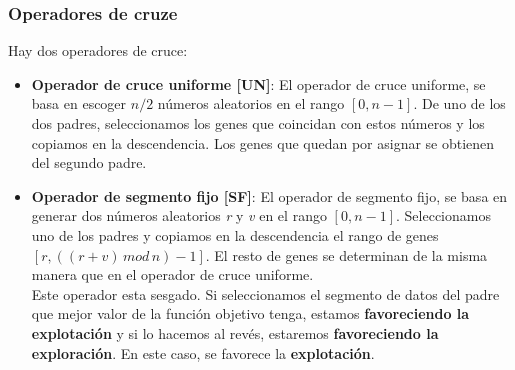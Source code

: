 \subsubsection{Operadores de cruze}
Hay dos operadores de cruce:
\begin{itemize}
   \item \textbf{Operador de cruce uniforme [UN]}: El operador de cruce uniforme, se basa en escoger $ n/2 $ números aleatorios en el rango $[0,n-1]$. De uno de los dos padres, seleccionamos los genes que coincidan con estos números y los copiamos en la descendencia. Los genes que quedan por asignar se obtienen del segundo padre.
   \item \textbf{Operador de segmento fijo [SF]}: El operador de segmento fijo, se basa en generar dos números aleatorios \emph{r} y \emph{v} en el rango $[0,n-1]$. Seleccionamos uno de los padres y copiamos en la descendencia el rango de genes $ [r,((r+v)\,mod\,n) - 1] $. El resto de genes se determinan de la misma manera que en el operador de cruce uniforme.\\
   Este operador esta sesgado. Si seleccionamos el segmento de datos del padre que mejor valor de la función objetivo tenga, estamos \textbf{favoreciendo la explotación} y si lo hacemos al revés, estaremos \textbf{favoreciendo la exploración}. En este caso, se favorece la \textbf{explotación}.
\end{itemize}
\newpage
